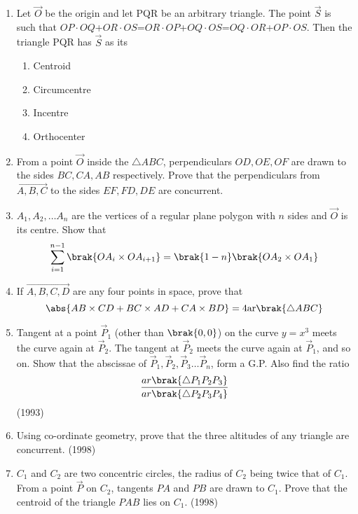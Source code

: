 \begin{enumerate}[label=\thesubsection.\arabic*.,ref=\thesubsection.\theenumi]
         \item %
		 Let $\vec{O}$ be the origin and let PQR be an arbitrary triangle. The point $\vec{S}$ is such that $OP\cdot OQ$+$OR\cdot OS$=$OR\cdot OP$+$OQ\cdot OS$=$OQ\cdot OR$+$OP\cdot OS$.
Then the triangle PQR has $\vec{S}$ as its \hfill{}
\begin{enumerate}
        \item Centroid                             
        \item Circumcentre                           
        \item Incentre            
        \item Orthocenter
\end{enumerate}
\item From a point $\vec{O}$ inside the $\triangle ABC$, perpendiculars $OD, OE, OF$ are drawn to the sides $BC, CA, AB$ respectively. Prove that the perpendiculars from $\vec{A,B,C}$ to the sides $EF, FD, DE$ are concurrent. \hfill{}
	\item $A_1,A_2,\dots A_n$ are the vertices of a regular plane polygon with $n$ sides and $\vec{O}$ is its centre. Show that
	$$\sum_{i=1}^{n-1}\brak{OA_i\times OA_{i+1}}= \brak{1-n}\brak{OA_2\times OA_1}$$
		\hfill{}
	\item If $\vec{A,B,C,D}$ are any four points in space, prove that
		$$\abs{AB\times CD+ BC\times AD+CA\times BD}=4\text{ar}\brak{\triangle ABC}$$  \hfill{}
	\item Tangent at a point $\vec{P}_{1}$ (other than $\brak{0, 0}$) on the curve $y=x^{3}$ meets the curve again at $\vec{P}_{2}$. The tangent at $\vec{P}_{2}$ meets the curve again at $\vec{P}_{1}$, and so on. Show that the abscissae of $\vec{P}_{1}, \vec{P}_{2}, \vec{P}_{3} \dots \vec{P}_{n}$, form a G.P. Also find the ratio
		$$\frac{ar\brak{\triangle P_{1}P_{2}P_{3}}}{ar\brak{\triangle P_{2}P_{3}P_{4}}}$$
	\hfill{(1993)}
\item Using co-ordinate geometry, prove that the three altitudes of any triangle are concurrent.
	\hfill{(1998)}
\item $C_{1}$ and $C_{2}$ are two concentric circles,  the radius of $C_{2}$ being twice that of $C_{1}$. From a point $\vec{P}$ on $C_{2}$,  tangents $PA$ and $PB$ are drawn to $C_{1}$. Prove that the centroid of the triangle $PAB$ lies on $C_{1}$.
	           \hfill(1998)
	\end{enumerate}
